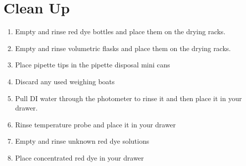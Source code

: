 \documentclass[letterpaper,10pt,english]{sphinxmanual}
\begin{document}
\section{Clean Up}
\label{\detokenize{Laboratory_Measurements/Laboratory_Measurements:clean-up}}\begin{enumerate}
\item {} 
Empty and rinse red dye bottles and place them on the drying racks.

\item {} 
Empty and rinse volumetric flasks and place them on the drying racks.

\item {} 
Place pipette tips in the pipette disposal mini cans

\item {} 
Discard any used weighing boats

\item {} 
Pull DI water through the photometer to rinse it and then place it in your drawer.

\item {} 
Rinse temperature probe and place it in your drawer

\item {} 
Empty and rinse unknown red dye solutions

\item {} 
Place concentrated red dye in your drawer

\end{enumerate}
\end{document}
